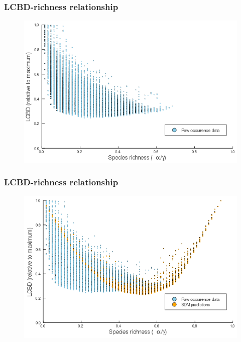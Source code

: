 \documentclass[10pt]{beamer}
\begin{document}
\begin{frame}
  \frametitle{LCBD-richness relationship}
  \begin{figure}
    \centering
    \includegraphics[scale=0.4]{fig/06_raw_relation.png}
  \end{figure}
\end{frame}

\begin{frame}
  \frametitle{LCBD-richness relationship}
  \begin{figure}
    \centering
    \includegraphics[scale=0.4]{fig/06_cmb_relation-oneplot.png}
  \end{figure}
\end{frame}
\end{document}
